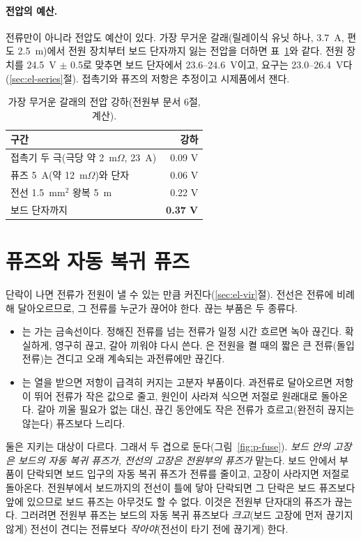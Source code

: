 \paragraph{전압의 예산.} 전류만이 아니라 전압도 예산이 있다. 가장 무거운 갈래(릴레이식 유닛 하나, 3.7~A, 편도 2.5~m)에서
전원 장치부터 보드 단자까지 잃는 전압을 더하면 표~\ref{tab:p-drop}와 같다. 전원 장치를 24.5~V $\pm$ 0.5로 맞추면 보드
단자에서 23.6--24.6~V이고, 요구는 23.0--26.4~V다(\ref{sec:el-series}절). 접촉기와 퓨즈의 저항은 추정이고 시제품에서 잰다.

\begin{table}[ht]
\centering
\caption{가장 무거운 갈래의 전압 강하(전원부 문서 6절, 계산).}
\label{tab:p-drop}
\small
\begin{tabular}{lr}
\toprule
구간 & 강하 \\
\midrule
접촉기 두 극(극당 약 2~m$\Omega$, 23~A) & 0.09 V \\
퓨즈 5~A(약 12~m$\Omega$)와 단자 & 0.06 V \\
전선 1.5~mm$^2$ 왕복 5~m & 0.22 V \\
\midrule
보드 단자까지 & \textbf{0.37 V} \\
\bottomrule
\end{tabular}
\end{table}

\section{퓨즈와 자동 복귀 퓨즈}\label{sec:p-fuse}

\Why 단락이 나면 전류가 전원이 낼 수 있는 만큼 커진다(\ref{sec:el-vir}절). 전선은 전류에 비례해 달아오르므로, 그 전류를
누군가 끊어야 한다. 끊는 부품은 두 종류다.
\begin{itemize}
\item {}는 가는 금속선이다. 정해진 전류를 넘는 전류가 일정 시간 흐르면 녹아 끊긴다. 확실하게, 영구히 끊고,
갈아 끼워야 다시 쓴다. 은 전원을 켤 때의 짧은 큰 전류(돌입 전류)는 견디고 오래 계속되는
과전류에만 끊긴다.
\item {}는 열을 받으면 저항이 급격히 커지는 고분자 부품이다. 과전류로 달아오르면
저항이 뛰어 전류가 작은 값으로 줄고, 원인이 사라져 식으면 저절로 원래대로 돌아온다. 갈아 끼울 필요가 없는 대신, 끊긴
동안에도 작은 전류가 흐르고(완전히 끊지는 않는다) 퓨즈보다 느리다.
\end{itemize}
둘은 지키는 대상이 다르다. 그래서 두 겹으로 둔다(그림~\ref{fig:p-fuse}). \emph{보드 안의 고장은 보드의 자동 복귀 퓨즈가,
전선의 고장은 전원부의 퓨즈가} 맡는다. 보드 안에서 부품이 단락되면 보드 입구의 자동 복귀 퓨즈가 전류를 줄이고, 고장이
사라지면 저절로 돌아온다. 전원부에서 보드까지의 전선이 틀에 닿아 단락되면 그 단락은 보드 퓨즈보다 앞에 있으므로 보드
퓨즈는 아무것도 할 수 없다. 이것은 전원부 단자대의 퓨즈가 끊는다. 그러려면 전원부 퓨즈는 보드의 자동 복귀 퓨즈보다
\emph{크고}(보드 고장에 먼저 끊기지 않게) 전선이 견디는 전류보다 \emph{작아야}(전선이 타기 전에 끊기게) 한다.

